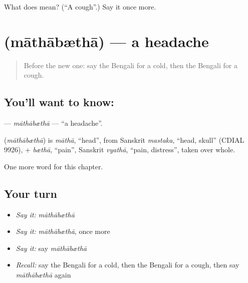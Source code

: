 \begin{tcolorbox}[breakable,colback=teal!4,colframe=teal!35!black,title={Before you move on}]
What does  mean? (\textquotedblleft{}A cough\textquotedblright{}.) Say it once more.
\end{tcolorbox}
\section[\texorpdfstring{\bn{মাথাব্যথা} (māthābæthā)}{মাথাব্যথা (māthābæthā)}]{ (māthābæthā) — a headache}

\label{lesson:BN-C154-mathabtha}



\begin{quote}
Before the new one: say the Bengali for a cold, then the Bengali for a cough.
\end{quote}

\subsection*{You'll want to know: }
\textbf{} — \emph{māthābæthā} — \textquotedblleft{}a headache\textquotedblright{}.

\begin{cousinweb}
\textbf{} (\emph{māthābæthā}) is \emph{māthā}, \textquotedblleft{}head\textquotedblright{}, from Sanskrit \emph{mastaka}, \textquotedblleft{}head, skull\textquotedblright{} (CDIAL 9926), + \emph{bæthā}, \textquotedblleft{}pain\textquotedblright{}, Sanskrit \emph{vyathā}, \textquotedblleft{}pain, distress\textquotedblright{}, taken over whole.
\end{cousinweb}

\begin{grammarlens}[title={What you've built}]
One more word for this chapter.
\end{grammarlens}

\subsection*{Your turn}
\begin{itemize}
\raggedright
  \item \emph{Say it:} \emph{māthābæthā}
  \item \emph{Say it:} \emph{māthābæthā}, once more
  \item \emph{Say it:} say \emph{māthābæthā}
  \item \emph{Recall:} say the Bengali for a cold, then the Bengali for a cough, then say \emph{māthābæthā} again
\end{itemize}

